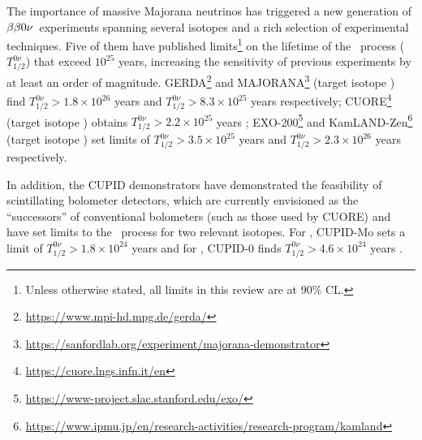 The importance of massive Majorana neutrinos 
has triggered a new generation of $\beta\beta0\nu$~experiments spanning several isotopes and a rich selection of experimental techniques.
%
Five of them have published limits\footnote{Unless otherwise stated, all limits in this review are at 90\% CL.}
 on the lifetime of the \bbonu\ process ($T^{0\nu}_{1/2}$) that exceed $10^{25}$ years, increasing the sensitivity of previous  experiments by at least an order of magnitude. GERDA\footnote{\url{https://www.mpi-hd.mpg.de/gerda/}} and MAJORANA\footnote{\url{https://sanfordlab.org/experiment/majorana-demonstrator}} (target isotope ) find \mbox{$T^{0\nu}_{1/2} > 1.8 \times 10^{26}$} years \cite{GERDA:2020xhi} and \mbox{$T^{0\nu}_{1/2} > 8.3 \times 10^{25}$} years \cite{Majorana:2022udl} respectively; CUORE\footnote{\url{https://cuore.lngs.infn.it/en}} (target isotope ) obtains \mbox{$T^{0\nu}_{1/2} > 2.2 \times 10^{25}$} years \cite{CUORE:2021mvw}; EXO-200\footnote{\url{https://www-project.slac.stanford.edu/exo/}} and KamLAND-Zen\footnote{\url{https://www.ipmu.jp/en/research-activities/research-program/kamland}} (target isotope ) set limits of \mbox{$T^{0\nu}_{1/2} > 3.5 \times 10^{25}$} years \cite{EXO-200:2019rkq} and \mbox{$T^{0\nu}_{1/2} > 2.3 \times 10^{26}$} years \cite{KamLAND-Zen:2022tow} respectively. 
 
 In addition, the CUPID demonstrators have demonstrated the feasibility of scintillating bolometer detectors, which are currently envisioned as the ``successors'' of conventional bolometers (such as those used by CUORE) and have set limits to the \bbonu\ process for two relevant isotopes.
For , CUPID-Mo sets a limit of \mbox{$T^{0\nu}_{1/2} > 1.8 \times 10^{24}$} years \cite{Augier:2022znx}
and for , CUPID-0 finds \mbox{$T^{0\nu}_{1/2} > 4.6 \times 10^{24}$} years \cite{CUPID:2022puj}. 


